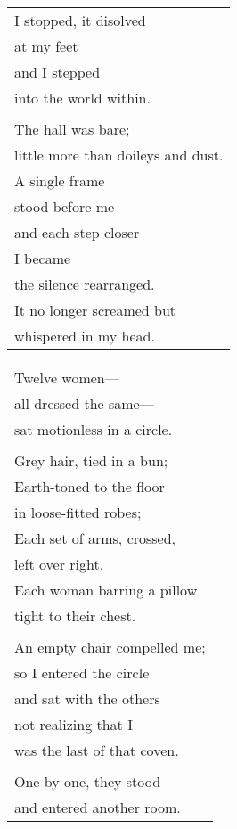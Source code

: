 \documentclass{article}
\begin{document}
\begin{center}
\begin{tabular}{l}
I stopped, it disolved \\
at my feet \\
and I stepped \\
into the world within. \\
\\
The hall was bare; \\
little more than doileys and dust. \\
A single frame \\
stood before me \\
and each step closer \\
I became \\
the silence rearranged. \\
It no longer screamed but \\
whispered in my head. \\
\end{tabular}
\begin{tabular}{l}
\\
Twelve women--- \\
all dressed the same--- \\
sat motionless in a circle. \\
\\
\hspace*{4ex}Grey hair, tied in a bun; \\
\hspace*{4ex}Earth-toned to the floor \\
\hspace*{6ex}in loose-fitted robes; \\
\hspace*{4ex}Each set of arms, crossed, \\
\hspace*{6ex}left over right. \\
\hspace*{4ex}Each woman barring a pillow \\
\hspace*{6ex}tight to their chest. \\
\\
An empty chair compelled me; \\
so I entered the circle \\
and sat with the others \\
not realizing that I \\
was the last of that coven. \\
\\
One by one, they stood \\
and entered another room. \\

\end{tabular}
\end{center}
\end{document}
